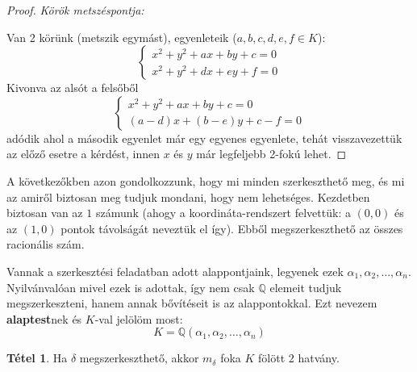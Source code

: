 \documentclass[12pt]{book}
\theoremstyle{plain} %
\theoremstyle{definition} %
\newtheorem{theo/}{Tétel}[section]
\newenvironment{theo}
  {\renewcommand{\qedsymbol}{$\clubsuit$}%
   \pushQED{\qed}\begin{theo/}}
  {\popQED\end{theo/}}
\theoremstyle{remark}
\renewcommand\qedsymbol{$\blacksquare$}
\numberwithin{equation}{section}  %
\begin{document}
\begin{proof}
		\textit{Körök metszéspontja:}
		
		Van 2 körünk (metszik egymást), egyenleteik ($a,b,c,d,e,f\in K$):
		\[
		\begin{cases*}
		x^2+y^2+ax+by+c=0 \\
		x^2+y^2+dx+ey+f=0
		\end{cases*}
		\]
		Kivonva az alsót a felsőből
		\[
		\begin{cases*}
		x^2+y^2+ax+by+c=0 \\
		(a-d)x+(b-e)y+c-f=0
		\end{cases*}
		\]
		adódik ahol a második egyenlet már egy egyenes egyenlete, tehát visszavezettük az előző esetre a kérdést, innen $x$ és $y$ már legfeljebb 2-fokú lehet.	
	\end{proof}

	A következőkben azon gondolkozzunk, hogy mi minden szerkeszthető meg, és mi az amiről biztosan meg tudjuk mondani, hogy nem lehetséges. Kezdetben biztosan van az $1$ számunk (ahogy a koordináta-rendszert felvettük: a $(0,0)$ és az $(1,0)$ pontok távolságát neveztük el így). Ebből megszerkeszthető az összes racionális szám.
	
	Vannak a szerkesztési feladatban adott alappontjaink, legyenek ezek $\alpha_1, \alpha_2, \ldots , \alpha_n$. Nyilvánvalóan mivel ezek is adottak, így nem csak $\mathbb{Q}$ elemeit tudjuk megszerkeszteni, hanem annak bővítéseit is az alappontokkal. Ezt nevezem \textbf{alaptest}nek és $K$-val jelölöm most:
	\[ K = \mathbb{Q}(\alpha_1,\alpha_2,\ldots,\alpha_n)  \]
	
	\begin{theo}\label{szukseges}
		Ha $\delta$ megszerkeszthető, akkor $m_\delta$ foka $K$ fölött 2 hatvány.
	\end{theo}
\end{document}
